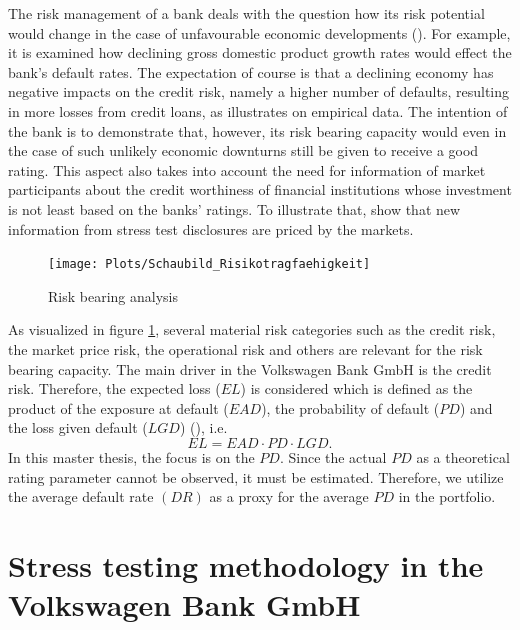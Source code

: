 \documentclass[a4paper, 11pt]{scrreprt}
\begin{document}
\bigskip 

The risk management of a bank deals with the question how its risk potential would change in the case of unfavourable economic developments (\textcite[MaRisk AT 4.3.3, note 3]{bafin2017marisk}).
For example, it is examined how declining gross domestic product growth rates would effect the bank's default rates. The expectation of course is that a declining economy has negative impacts on the credit risk, namely a higher number of defaults, resulting in more losses from credit loans, as \textcite[p. 112]{wilson1997wilsonI} illustrates on empirical data.
The intention of the bank is to demonstrate that, however, its risk bearing capacity would even in the case of such unlikely economic downturns still be given to receive a good rating. 
This aspect also takes into account the need for information of market participants about the credit worthiness of financial institutions whose investment is not least based on the banks' ratings. To illustrate that, \textcite[p. 5]{gross2017dostresstestsmatter} show that new information from stress test disclosures are priced by the markets.

\begin{figure}[H]
	\centering
	\texttt{[image: Plots/Schaubild\_Risikotragfaehigkeit]}
	\caption{Risk bearing analysis}
	\label{image:riskbearinganalysis}
\end{figure}


As visualized in figure \ref{image:riskbearinganalysis}, several material risk categories such as the credit risk, the market price risk, the operational risk and others are relevant for the risk bearing capacity. The main driver in the Volkswagen Bank GmbH is the credit risk. Therefore, the expected loss ($EL$) is considered which is defined as the product of the exposure at default ($EAD$), the probability of default ($PD$) and the loss given default ($LGD$) (\textcite[p. 188]{engelmann2011baselii}), i.e.
\begin{equation}\label{EL}
EL = EAD \cdot PD \cdot LGD.
\end{equation}
In this master thesis, the focus is on the $PD$. Since the actual $PD$ as a theoretical rating parameter cannot be observed, it must be estimated. Therefore, we utilize the average default rate $(DR)$ as a proxy for the average $PD$ in the portfolio.

\bigskip

\section{Stress testing methodology in the Volkswagen Bank GmbH}
\end{document}
